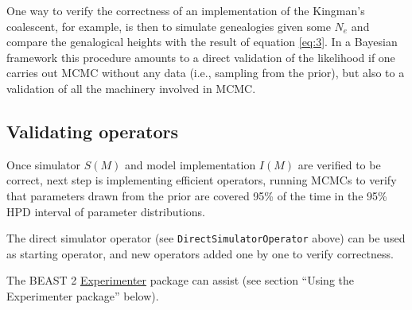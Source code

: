 \documentclass[oneside]{article}
\begin{document}


One way to verify the correctness of an implementation of the Kingman's
coalescent, for example, is then to simulate genealogies given some
$N_e$ and compare the genalogical heights with the result of equation
\ref{eq:3}.
In a Bayesian framework this procedure amounts to a direct validation of the
likelihood if one carries out MCMC without any data (i.e., sampling
from the prior), but also to a validation of all the machinery involved in MCMC.




\subsection{Validating operators}

Once simulator \(S(M)\) and model implementation \(I(M)\) are verified
to be correct, next step is implementing efficient operators, running
MCMCs to verify that parameters drawn from the prior are covered 95\% of
the time in the 95\% HPD interval of parameter distributions.

The direct simulator operator (see \texttt{DirectSimulatorOperator}
above) can be used as starting operator, and new operators added one by
one to verify correctness.

The BEAST 2
\href{https://github.com/rbouckaert/Experimenter}{Experimenter} package
can assist (see section ``Using the Experimenter package'' below).
\end{document}

